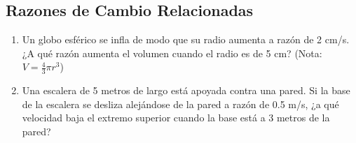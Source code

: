 \documentclass[12pt,a4paper]{article}
\begin{document}
\subsection{Razones de Cambio Relacionadas}
\begin{enumerate}
    \item Un globo esférico se infla de modo que su radio aumenta a razón de 2 cm/s. ¿A qué razón aumenta el volumen cuando el radio es de 5 cm? (Nota: $V = \frac{4}{3}\pi r^3$)
    
    \item Una escalera de 5 metros de largo está apoyada contra una pared. Si la base de la escalera se desliza alejándose de la pared a razón de 0.5 m/s, ¿a qué velocidad baja el extremo superior cuando la base está a 3 metros de la pared?
\end{enumerate}
\end{document}
